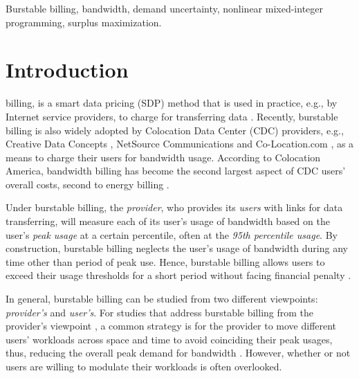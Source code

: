 \documentclass[10pt,journal,compsoc]{IEEEtran}
\begin{document}
\begin{IEEEkeywords}
Burstable billing, bandwidth, demand uncertainty, nonlinear mixed-integer programming, surplus maximization.
\end{IEEEkeywords}










\IEEEpeerreviewmaketitle



\section{Introduction}\label{sec:introduction}






 billing, is a smart data pricing (SDP) method that is used in practice, e.g., by Internet service providers, to charge for transferring data \cite{Odlyzko2001,Dimitropoulos2009,ReddyvariRaja2014,Sathiaseelan2015}. Recently, burstable billing is also widely adopted by Colocation Data Center (CDC) providers, e.g., Creative Data Concepts \cite{cdc:bandwidth}, NetSource Communications \cite{netsource:bandwidth} and Co-Location.com \cite{co-location.com:bandwidth},  as a means to charge their users for bandwidth usage.
According to Colocation America, bandwidth billing has become the second largest aspect of CDC users' overall costs, second to energy billing \cite{colocationamerica:bandwidth}.

Under burstable billing, the \emph{provider}, who provides its \emph{users} with links for data transferring, will measure each of its user's usage of bandwidth based on the user's \emph{peak usage} at a certain percentile, often at the \emph{95th percentile usage}. By construction, burstable billing neglects the user's usage of bandwidth during any time other than period of peak use. Hence, burstable billing allows users to exceed their usage thresholds for a short period without facing financial penalty \cite{ReddyvariRaja2014}.







In general, burstable billing can be studied from two different viewpoints: \emph{provider's} and \emph{user's}. For studies that address burstable billing from the provider's viewpoint \cite{Dimitropoulos2009,ReddyvariRaja2014,Raja2014,Clegg2014}, a common strategy is for the provider to move different users' workloads across space and time to avoid coinciding their peak usages, thus, reducing the overall peak demand for bandwidth \cite{Clegg2014}. However, whether or not users are willing to modulate their workloads is often overlooked.
\end{document}
